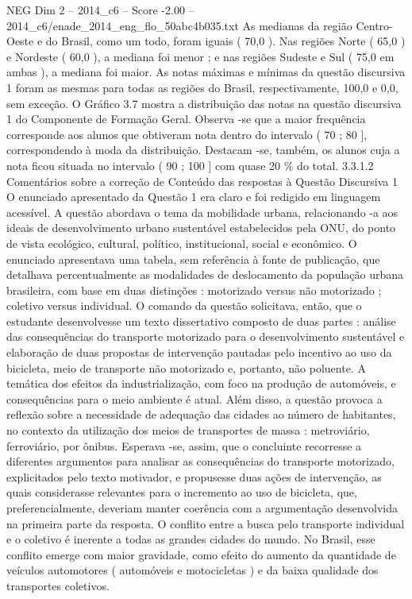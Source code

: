 \begin{textsample}{NEG Dim 2 – 2014\_c6 – Score -2.00 – 2014\_c6/enade\_2014\_eng\_flo\_50abc4b035.txt}
As medianas da região Centro-Oeste e do Brasil, como um todo, foram iguais ( 70,0 ).
Nas regiões Norte ( 65,0 ) e Nordeste ( 60,0 ), a mediana foi menor ; e nas regiões Sudeste e Sul ( 75,0 em ambas ), a mediana foi maior.
As notas máximas e mínimas da questão discursiva 1 foram as mesmas para todas as regiões do Brasil, respectivamente, 100,0 e 0,0, sem exceção.
O Gráfico 3.7 mostra a distribuição das notas na questão discursiva 1 do Componente de Formação Geral.
Observa -se que a maior frequência corresponde aos alunos que obtiveram nota dentro do intervalo ( 70 ; 80 ], correspondendo à moda da distribuição.
Destacam -se, também, os alunos cuja a nota ficou situada no intervalo ( 90 ; 100 ] com quase 20 \% do total. 3.3.1.2 Comentários sobre a correção de Conteúdo das respostas à Questão Discursiva 1 O enunciado apresentado da Questão 1 era claro e foi redigido em linguagem acessível.
A questão abordava o tema da mobilidade urbana, relacionando -a aos ideais de desenvolvimento urbano sustentável estabelecidos pela ONU, do ponto de vista ecológico, cultural, político, institucional, social e econômico.
O enunciado apresentava uma tabela, sem referência à fonte de publicação, que detalhava percentualmente as modalidades de deslocamento da população urbana brasileira, com base em duas distinções : motorizado versus não motorizado ; coletivo versus individual.
O comando da questão solicitava, então, que o estudante desenvolvesse um texto dissertativo composto de duas partes : análise das consequências do transporte motorizado para o desenvolvimento sustentável e elaboração de duas propostas de intervenção pautadas pelo incentivo ao uso da bicicleta, meio de transporte não motorizado e, portanto, não poluente.
A temática dos efeitos da industrialização, com foco na produção de automóveis, e consequências para o meio ambiente é atual.
Além disso, a questão provoca a reflexão sobre a necessidade de adequação das cidades ao número de habitantes, no contexto da utilização dos meios de transportes de massa : metroviário, ferroviário, por ônibus.
Esperava -se, assim, que o concluinte recorresse a diferentes argumentos para analisar as consequências do transporte motorizado, explicitados pelo texto motivador, e propusesse duas ações de intervenção, as quais considerasse relevantes para o incremento ao uso de bicicleta, que, preferencialmente, deveriam manter coerência com a argumentação desenvolvida na primeira parte da resposta.
O conflito entre a busca pelo transporte individual e o coletivo é inerente a todas as grandes cidades do mundo.
No Brasil, esse conflito emerge com maior gravidade, como efeito do aumento da quantidade de veículos automotores ( automóveis e motocicletas ) e da baixa qualidade dos transportes coletivos.

\end{textsample}
